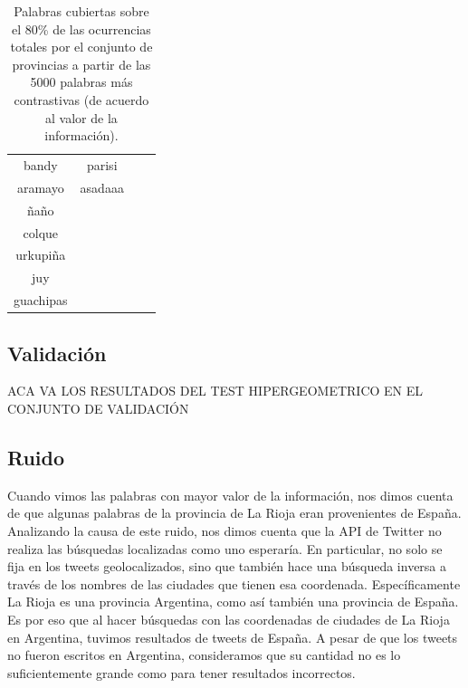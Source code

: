 \begin{table}[]
{\begin{tabular}{|c|c|c|c|}
bandy       & parisi           &                                &                            \\
aramayo     & asadaaa          &                                &                            \\
ñaño        &                  &                                &                            \\
colque      &                  &                                &                            \\
urkupiña    &                  &                                &                            \\
juy         &                  &                                &                            \\
guachipas   &                  &                                &                            \\ \hline
\end{tabular}%
}
\caption{Palabras cubiertas sobre el 80\% de las ocurrencias totales por el conjunto de provincias a partir de las 5000 palabras más contrastivas (de acuerdo al valor de la información).}
\label{tab:palabrasRegiones}
\end{table}


\subsection{Validación}
ACA VA LOS RESULTADOS DEL TEST HIPERGEOMETRICO EN EL CONJUNTO DE VALIDACIÓN

\subsection{Ruido}
\label{ssub:ruido}


Cuando vimos las palabras con mayor valor de la información, nos dimos cuenta de que algunas palabras de la provincia de La Rioja eran provenientes de España. Analizando la causa de este ruido, nos dimos cuenta que la API de Twitter no realiza las búsquedas localizadas como uno esperaría. En particular, no solo se fija en los tweets geolocalizados, sino que también hace una búsqueda inversa a través de los nombres de las ciudades que tienen esa coordenada. Específicamente La Rioja es una provincia Argentina, como así también una provincia de España. Es por eso que al hacer búsquedas con las coordenadas de ciudades de La Rioja en Argentina, tuvimos resultados de tweets de España. A pesar de que los tweets no fueron escritos en Argentina, consideramos que su cantidad no es lo suficientemente grande como para tener resultados incorrectos.



